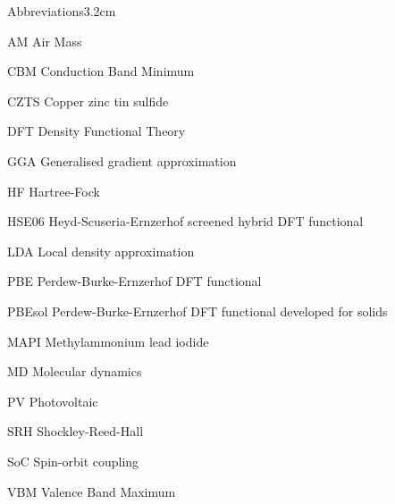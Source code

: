 \begin{mclistof}{Abbreviations}{3.2cm}

\item[AM] Air Mass
\item[CBM] Conduction Band Minimum
\item[CZTS] Copper zinc tin sulfide
\item[DFT] Density Functional Theory
\item[GGA] Generalised gradient approximation
\item[HF] Hartree-Fock
\item[HSE06] Heyd-Scuseria-Ernzerhof screened hybrid DFT functional 
\item[LDA] Local density approximation
\item[PBE] Perdew-Burke-Ernzerhof DFT functional
\item[PBEsol] Perdew-Burke-Ernzerhof DFT functional developed for solids
\item[MAPI] Methylammonium lead iodide
\item[MD] Molecular dynamics
\item[PV] Photovoltaic
\item[SRH] Shockley-Reed-Hall 
\item[SoC] Spin-orbit coupling
\item[VBM] Valence Band Maximum

\end{mclistof} 
